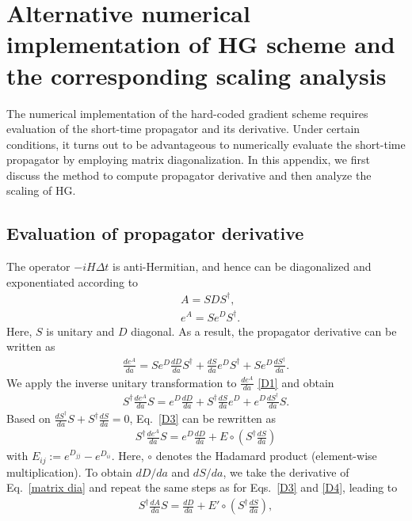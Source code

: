 \documentclass[letterpaper,10pt]{iopart}
\begin{document}
\section{Alternative numerical implementation of HG scheme and the corresponding scaling analysis}
\label{scalingmatrixdiag}
The numerical implementation of the hard-coded gradient scheme requires evaluation of the short-time propagator and its derivative. Under certain conditions, it turns out to be advantageous to numerically evaluate the short-time propagator by employing matrix diagonalization. In this appendix, we first discuss the method to compute propagator derivative and then analyze the scaling of HG.


\subsection{Evaluation of propagator derivative }
The operator $-iH\Delta t$ is anti-Hermitian, and hence can be diagonalized and exponentiated according to 
\begin{align}
\label{matrix dia}    &A=SDS^\dagger,\\
    &e^A=Se^DS^\dagger.
\end{align}
Here, $S$ is unitary and $D$ diagonal. As a result, the propagator derivative can be written as
\begin{align}
\label{D1}
    \frac{d e^{A}}{d a}=Se^D\frac{dD}{da}S^\dagger+\frac{dS}{da}e^DS^\dagger+Se^D\frac{dS^\dagger}{da}.
\end{align}
We apply the inverse unitary transformation to $\frac{d e^{A}}{d a}$ \eqref{D1} and obtain
\begin{align}
\label{D3}
    S^\dagger\frac{de^A}{da}S=e^D\frac{dD}{da}+S^\dagger\frac{dS}{da}e^D+e^D\frac{dS^\dagger}{da}S.
\end{align}
Based on $\frac{dS^\dagger}{da}S+S^\dagger\frac{dS}{da}=0$, Eq.\ \eqref{D3} can be rewritten as 
\begin{align}
\label{D4}
    S^\dagger \frac{de^A}{da}S=e^D\frac{dD}{da}+E\circ(S^\dagger\frac{dS}{da})
\end{align}
with $E_{ij}:=e^{D_{jj}}-e^{D_{ii}}$. Here, $\circ$ denotes the Hadamard product (element-wise multiplication). To obtain $dD/da$ and $dS/da$, we take the derivative of Eq.\ \eqref{matrix dia} and repeat the same steps as for Eqs.\ \eqref{D3} and \eqref{D4}, leading to
\begin{align}
\label{D5}
    S^\dagger\frac{dA}{da}S=\frac{dD}{da}+E'\circ(S^\dagger\frac{dS}{da}),
\end{align}
\end{document}
